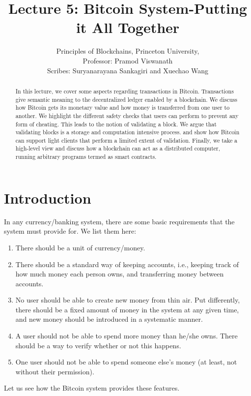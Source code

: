 \documentclass{article}
\title{Lecture 5:  Bitcoin System-Putting it All Together}
\author{Principles of Blockchains, Princeton University,  \\ Professor:  Pramod Viswanath \\ Scribes: Suryanarayana Sankagiri and Xuechao Wang}
\begin{document}
\maketitle

\begin{abstract}
In this lecture, we cover some aspects regarding transactions in Bitcoin. Transactions give semantic meaning to the decentralized ledger enabled by a blockchain. We discuss how Bitcoin gets its monetary value and how money is transferred from one user to another. We highlight the different safety checks that users can perform to prevent any form of cheating. This leads to the notion of validating a block. We argue that validating blocks is a storage and computation intensive process. and show how Bitcoin can support light clients that perform a limited extent of validation. Finally, we take a high-level view and discuss how a blockchain can act as a distributed computer, running arbitrary programs termed as smart contracts.
\end{abstract}

\section*{Introduction} 
In any currency/banking system, there are some basic requirements that the system must provide for. We list them here:
\begin{enumerate}
    \item There should be a unit of currency/money.
    \item There should be a standard way of keeping accounts, i.e., keeping track of how much money each person owns, and transferring money between accounts. 
    \item No user should be able to create new money from thin air. Put differently, there should be a fixed amount of money in the system at any given time, and new money should be introduced in a systematic manner.
    \item A user should not be able to spend more money than he/she owns. There should be a way to verify whether or not this happens.
    \item One user should not be able to spend someone else's money (at least, not without their permission).
\end{enumerate}
Let us see how the Bitcoin system provides these features.
\end{document}
